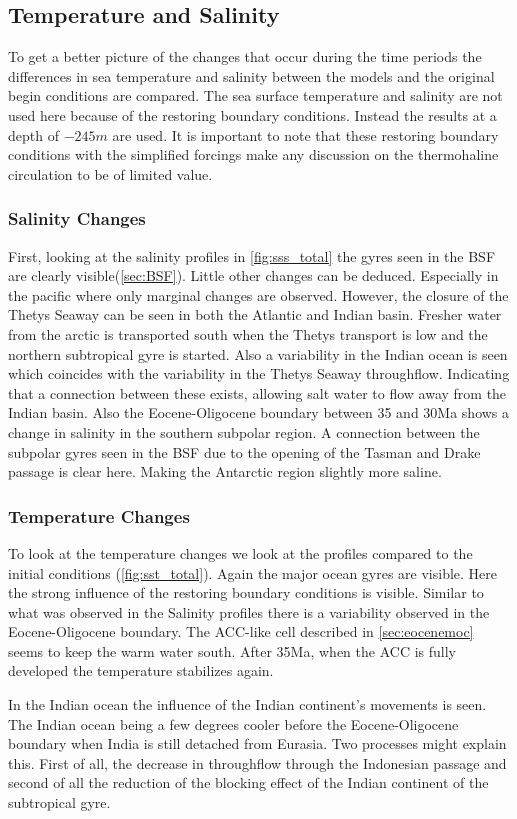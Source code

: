 \subsection{Temperature and Salinity}\label{sec:temp+sal}
To get a better picture of the changes that occur during the time periods the differences in sea temperature and salinity between the models and the original begin conditions are compared. The sea surface temperature and salinity are not used here because of the restoring boundary conditions. Instead the results at a depth of $-245m$ are used. It is important to note that these restoring boundary conditions with the simplified forcings make any discussion on the thermohaline circulation to be of limited value.

\subsubsection{Salinity Changes}
First, looking at the salinity profiles in \cref{fig:sss_total} the gyres seen in the BSF are clearly visible(\cref{sec:BSF}).
Little other changes can be deduced. Especially in the pacific where only marginal changes are observed. However, the closure of the Thetys Seaway can be seen in both the Atlantic and Indian basin. Fresher water from the arctic is transported south when the Thetys transport is low and the northern subtropical gyre is started. Also a variability in the Indian ocean is seen which coincides with the variability in the Thetys Seaway throughflow. Indicating that a connection between these exists, allowing salt water to flow away from the Indian basin. Also the Eocene-Oligocene boundary between 35 and 30Ma shows a change in salinity in the southern subpolar region. A connection between the subpolar gyres seen in the BSF due to the opening of the Tasman and Drake passage is clear here. Making the Antarctic region slightly more saline. 

\subsubsection{Temperature Changes}
To look at the temperature changes we look at the profiles compared to the initial conditions (\cref{fig:sst_total}). Again the major ocean gyres are visible. Here the strong influence of the restoring boundary conditions is visible. Similar to what was observed in the Salinity profiles there is a variability observed in the Eocene-Oligocene boundary. The ACC-like cell described in \cref{sec:eocenemoc} seems to keep the warm water south. After 35Ma, when the ACC is fully developed the temperature stabilizes again.

In the Indian ocean the influence of the Indian continent's movements is seen. The Indian ocean being a few degrees cooler before the Eocene-Oligocene boundary when India is still detached from Eurasia. Two processes might explain this. First of all, the decrease in throughflow through the Indonesian passage and second of all the reduction of the blocking effect of the Indian continent of the subtropical gyre.